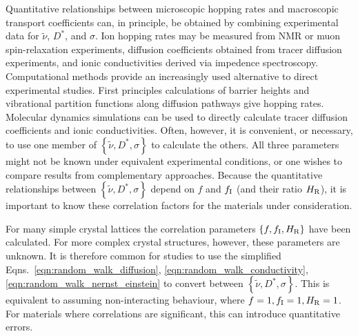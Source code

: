\documentclass[aps,prb,twocolumn,superscriptaddress,reprint]{revtex4-1}
\newcommand{\set}[1]{\left\{#1\right\}}
\newcommand{\hrpa}{{\widetilde{\nu}}}
\begin{document}
Quantitative relationships between microscopic hopping rates and macroscopic transport coefficients can, in principle, be obtained by combining experimental data for $\hrpa$, $D^*$, and $\sigma$. 
Ion hopping rates may be measured from NMR or muon spin-relaxation experiments,\cite{WilkeningEtAl_PhysRevLett2006, RuprechtEtAl_PhysChemChemPhys2012, Enciso-MaldonadoEtAl_ChemMater2015,Santibanez-MendietaEtAl_ChemMater2016, NozakiEtAl_SolStatIonics2014,AmoresEtAl_JMaterChemA2016} diffusion coefficients obtained from tracer diffusion experiments,\cite{BaylissEtAl_AdvEnergyMater2014} and ionic conductivities derived via impedence spectroscopy.\cite{ZeierEtAl_ACSApplMaterInt2014,Lopez-BermudezEtAl_2016} Computational methods provide an increasingly used alternative to direct experimental studies. 
First principles calculations of barrier heights and vibrational partition functions along diffusion pathways give hopping rates.\cite{VanDerVenEtAl_PhysRevB2001, MantinaEtAl_PhysRevLett2008} Molecular dynamics simulations can be used to directly calculate tracer diffusion coefficients and ionic conductivities.\cite{MorganAndMadden_JPhysCondensMat2012} Often, however, it is convenient, or necessary, to use one member of $\set{\hrpa,D^*,\sigma}$ to calculate the others. 
All three parameters might not be known under equivalent experimental conditions, or one wishes to compare results from complementary approaches. 
Because the quantitative relationships between $\set{\hrpa,D^*,\sigma}$ depend on $f$ and $f_{\mathrm{I}}$ (and their ratio $H_{\mathrm{R}}$), it is important to know these correlation factors for the materials under consideration.

For many simple crystal lattices the correlation parameters $\set{f, f_\m{I}, H_\m{R}}$ have been calculated.\cite{Friauf_JApplPhys1962,Murch_SolStatIonics1982} For more complex crystal structures, however, these parameters are unknown. 
It is therefore common for studies to use the simplified Eqns.\ \ref{eqn:random_walk_diffusion}, \ref{eqn:random_walk_conductivity}, \ref{eqn:random_walk_nernst_einstein} to convert between $\set{\hrpa,D^*,\sigma}$. This is equivalent to assuming non-interacting behaviour, where $f=1, f_{\mathrm{I}}=1, H_{\mathrm{R}}=1$. For materials where correlations are significant, this can introduce quantitative errors.
\end{document}

